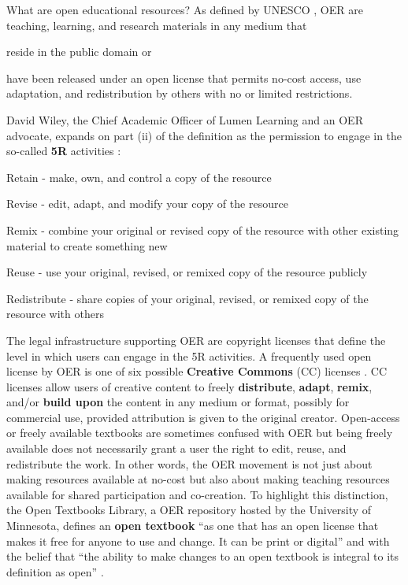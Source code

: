 \documentclass[11pt]{article}
\begin{document}
What are open educational resources?  As defined by UNESCO \cite{oerworldcongress}, OER are teaching, learning, and research materials in any medium that
\begin{compactenum}[(i)]
\item reside in the public domain or
\item have been released under an open license that permits no-cost access, use adaptation, and redistribution by others with no or limited restrictions.
\end{compactenum}
David Wiley, the Chief Academic Officer of Lumen Learning and an OER advocate, expands on part (ii) of the definition as the permission to engage in the so-called \textbf{5R} activities \cite{wileynd}:
\begin{compactenum}[(i)]
  \item Retain - make, own, and control a copy of the resource
  \item Revise - edit, adapt, and modify your copy of the resource
  \item Remix - combine your original or revised copy of the resource with other existing material to create something new
  \item Reuse - use your original, revised, or remixed copy of the resource publicly
  \item Redistribute - share copies of your original, revised, or remixed copy of the resource with others
\end{compactenum}

The legal infrastructure supporting OER are copyright licenses that define the level in which users can engage in the 5R activities.  A frequently used open license by OER is one of six possible \textbf{Creative Commons} (CC) licenses \cite{CClicenses:nd}. CC licenses allow users of creative content to freely \textbf{distribute}, \textbf{adapt}, \textbf{remix}, and/or \textbf{build upon} the content in any medium or format, possibly for commercial use, provided attribution is given to the original creator.  Open-access or freely available textbooks are sometimes confused with OER but being freely available does not necessarily grant a user the right to edit, reuse, and redistribute the work.  In other words, the OER movement is not just about making resources available at no-cost but also about making teaching resources available for shared participation and co-creation.  To highlight this distinction, the Open Textbooks Library, a OER repository hosted by the University of Minnesota, defines an \textbf{open textbook} ``as one that has an open license that makes it free for anyone to use and change. It can be print or digital'' and with the belief that ``the ability to make changes to an open textbook is integral to its definition as open'' \cite{opentextbooksfaq:nd}.
\end{document}
